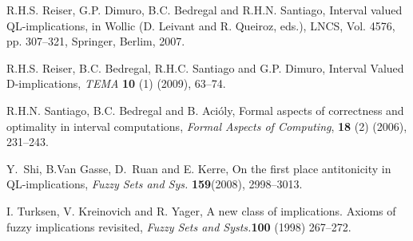 \documentclass[12pt]{article}
\theoremstyle{plain}
\theoremstyle{remark}
\theoremstyle{definition}
\theoremstyle{proposition}
\begin{document}
\begin{thebibliography}{8}
{
R.H.S. Reiser, G.P. Dimuro, B.C. Bedregal and R.H.N. Santiago, Interval valued {QL}-implications, in Wollic (D. Leivant and R.  Queiroz, eds.),  LNCS, Vol. 4576, pp. 307--321, Springer, Berlim,
2007.


 R.H.S. Reiser, B.C. Bedregal, R.H.C. Santiago and G.P. Dimuro,
Interval Valued {D}-implications, \emph{TEMA} \textbf{10} (1)
(2009), 63--74.

%

R.H.N. Santiago, B.C. Bedregal and  B. Aci\'oly, Formal aspects of correctness and optimality in interval
  computations, \emph{Formal Aspects of Computing}, \textbf{18} (2) (2006),  231--243.


Y.~Shi, B.Van Gasse, D.~Ruan and E. Kerre, On the first place
anti\-tonicity in QL-implications,\hspace{-0.1cm} \emph{Fuzzy Sets and Sys.}
\textbf{159}\hspace{-0.1cm}(2008),\hspace{-0.1cm} 2998--3013.


I. Turksen, V. Kreinovich and R. Yager, A new class of implications. Axioms of fuzzy implications revisited, \emph{Fuzzy Sets and Systs.}\textbf{100} (1998) 267--272.



}
\end{thebibliography}
\end{document}
